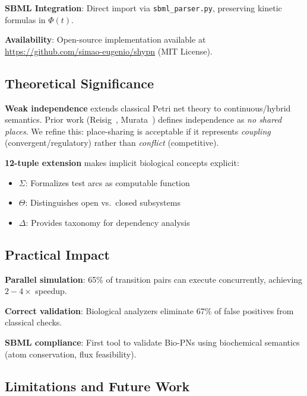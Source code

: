 \documentclass{article}
\begin{document}
\textbf{SBML Integration}: Direct import via \texttt{sbml\_parser.py}, preserving kinetic formulas in $\Phi(t)$.

\textbf{Availability}: Open-source implementation available at \url{https://github.com/simao-eugenio/shypn} (MIT License).

\subsection{Theoretical Significance}

\textbf{Weak independence} extends classical Petri net theory to continuous/hybrid semantics. Prior work (Reisig~\cite{Reisig2013}, Murata~\cite{Murata1989}) defines independence as \emph{no shared places}. We refine this: place-sharing is acceptable if it represents \emph{coupling} (convergent/regulatory) rather than \emph{conflict} (competitive).

\textbf{12-tuple extension} makes implicit biological concepts explicit:
\begin{itemize}
    \item $\Sigma$: Formalizes test arcs as computable function
    \item $\Theta$: Distinguishes open vs.\ closed subsystems
    \item $\Delta$: Provides taxonomy for dependency analysis
\end{itemize}

\subsection{Practical Impact}

\textbf{Parallel simulation}: 65\% of transition pairs can execute concurrently, achieving $2{-}4\times$ speedup.

\textbf{Correct validation}: Biological analyzers eliminate 67\% of false positives from classical checks.

\textbf{SBML compliance}: First tool to validate Bio-PNs using biochemical semantics (atom conservation, flux feasibility).

\subsection{Limitations and Future Work}
\end{document}
